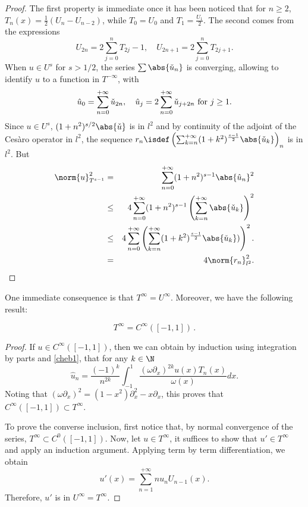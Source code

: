 \documentclass[a4paper]{article}
\begin{document}
	\begin{proof}
		The first property is immediate once it has been noticed that for $n \geq 2$, $T_n(x) = \frac{1}{2}\left(U_n - U_{n-2}\right)$, while $T_0 = U_0$ and $T_1 = \frac{U_ 1}{2}$. The second comes from the expressions
		\[U_{2n} = 2\sum_{j = 0}^n T_{2j} - 1, \quad U_{2n+1} = 2\sum_{j=0}^n T_{2j+1}.\]
		When $u \in U^{s}$ for $s > 1/2$, the series $\sum \abs{\check{u}_n}$ is converging, allowing to identify $u$ to a function in $T^{-\infty}$, with 
		\[\hat{u}_{0} = \sum_{n=0}^{+ \infty} \check{u}_{2n}, \quad  \hat{u}_j = 2\sum_{n=0}^{+\infty} \check{u}_{j + 2n} \textup{ for } j \geq 1.\]
		Since $u \in U^s$, $(1+n^2)^{s/2} \abs{\check{u}}$ is in $l^2$ and by continuity of the adjoint of the Cesàro operator in $l^2$, the sequence $r_n \isdef \left( \sum_{k=n}^{+ \infty} (1+k^2)^{\frac{s-1}{2}} \abs{\check{u}_k}\right)_n$ is in $l^2$. But
		\begin{eqnarray*}
			\norm{u}_{T^{s-1}}^2 &=& \sum_{n=0}^{+ \infty} (1 + n^2)^{s-1} \abs{\hat{u}_n}^2\\ 
			&\leq& 4\sum_{n=0}^{+\infty}(1+n^2)^{s-1} \left(\sum_{k=n}^{+\infty} \abs{\check{u}_k}\right)^2 \\
			&\leq& 4\sum_{n=0}^{+ \infty}\left(\sum_{k=n}^{+\infty}(1+k^2)^{\frac{s-1}{2}} \abs{\check{u}_k})\right)^2.\\
			&=& 4\norm{r_n}^2_{l^2}.
		\end{eqnarray*}	
	\end{proof}
	One immediate consequence is that $T^{\infty} = U^{\infty}$.  Moreover, we have the following result:
	\begin{Lem}
		\[T^{\infty} = C^{\infty}([-1,1])\,.\]
		\label{LemTinfCinf}
	\end{Lem}
	\begin{proof}
		If $u \in C^{\infty}([-1,1])$, then we can obtain by induction using integration by parts and \eqref{cheb1}, that for any $k \in \N$
		\[\hat{u}_n = \frac{(-1)^k}{n^{2k}} \int_{-1}^{1} \dfrac{(\omega\partial_x)^{2k} u(x) T_n(x)}{\omega(x)}dx.\]
		Noting that $(\omega \partial_x)^2 = (1-x^2)\partial_x^2 - x \partial_ x$, this proves that $C^{\infty}([-1,1]) \subset T^{\infty}$. 
		
		To prove the converse inclusion, first notice that, by normal convergence of the series, $T^{\infty} \subset C^0([-1,1]) $. Now, let $u \in T^{\infty}$, it suffices to show that $u' \in T^{\infty}$ and apply an induction argument. Applying term by term differentiation, we obtain
		\[u'(x) = \sum_{n=1}^{+\infty} n u_n U_{n-1}(x).\] 
		Therefore, $u'$ is in $U^{\infty} = T^{\infty}$. 
	\end{proof}
\end{document}
